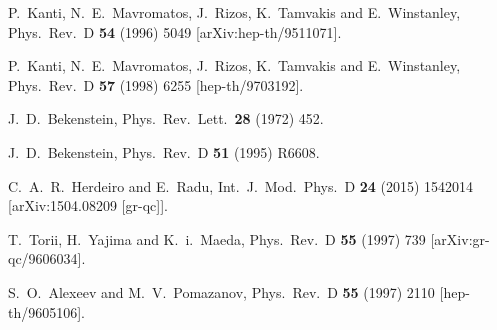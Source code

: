 \documentclass[12pt]{article}
\begin{document}
\begin{small}
\begin{thebibliography}{99}
  P.~Kanti, N.~E.~Mavromatos, J.~Rizos, K.~Tamvakis and E.~Winstanley,
  Phys.\ Rev.\  D {\bf 54} (1996) 5049
  [arXiv:hep-th/9511071].

  P.~Kanti, N.~E.~Mavromatos, J.~Rizos, K.~Tamvakis and E.~Winstanley,
  Phys.\ Rev.\ D {\bf 57} (1998) 6255
  [hep-th/9703192].

  J.~D.~Bekenstein,
  Phys.\ Rev.\ Lett.\  {\bf 28} (1972) 452.


  J.~D.~Bekenstein,
  Phys.\ Rev.\ D {\bf 51} (1995)   R6608.

  C.~A.~R.~Herdeiro and E.~Radu,
  Int.\ J.\ Mod.\ Phys.\ D {\bf 24} (2015)   1542014
  [arXiv:1504.08209 [gr-qc]].

 
  T.~Torii, H.~Yajima and K.~i.~Maeda,
  Phys.\ Rev.\  D {\bf 55} (1997) 739
  [arXiv:gr-qc/9606034].
  
  S.~O.~Alexeev and M.~V.~Pomazanov,
  Phys.\ Rev.\ D {\bf 55} (1997) 2110
  [hep-th/9605106].



\end{thebibliography}
\end{small}
\end{document}
